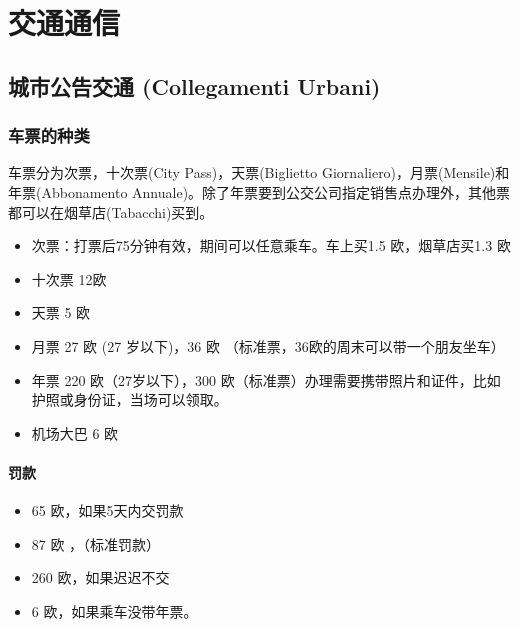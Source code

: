 
% 


\chapter{交通通信}                 %

\section{城市公告交通 (Collegamenti Urbani)}

\subsection{车票的种类}
车票分为次票，十次票(City Pass)，天票(Biglietto Giornaliero)，月票(Mensile)和年票(Abbonamento Annuale)。除了年票要到公交公司指定销售点办理外，其他票都可以在烟草店(Tabacchi)买到。
\begin{itemize}
\item  次票：打票后75分钟有效，期间可以任意乘车。车上买1.5 欧，烟草店买1.3 欧
\item  十次票 12欧
\item  天票 5 欧
\item  月票 27 欧 (27 岁以下)，36 欧 （标准票，36欧的周末可以带一个朋友坐车）
\item  年票 220 欧（27岁以下），300 欧（标准票）办理需要携带照片和证件，比如护照或身份证，当场可以领取。
\item  机场大巴 6 欧
\end{itemize}


\subsubsection{罚款}
\begin{itemize}
\item  65 欧，如果5天内交罚款
\item  87 欧 ，（标准罚款）
\item  260 欧，如果迟迟不交
\item  6 欧，如果乘车没带年票。
\end{itemize}

